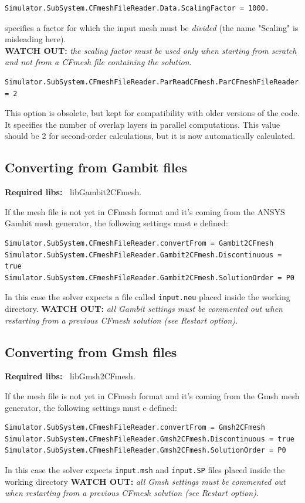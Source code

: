 \documentclass[11pt]{article}
\begin{document}
\begin{verbatim}
Simulator.SubSystem.CFmeshFileReader.Data.ScalingFactor = 1000. 
\end{verbatim}
specifies a factor for which the input mesh must be {\it divided} (the name "Scaling" is misleading here). \\
{\bf WATCH OUT:} {\it the scaling factor must be used only when starting from scratch and not from a CFmesh file
  containing the solution.}
  
\begin{verbatim}
Simulator.SubSystem.CFmeshFileReader.ParReadCFmesh.ParCFmeshFileReader.NbOverlapLayers = 2
\end{verbatim}
This option is obsolete, but kept for compatibility with older versions of the code. It specifies the number 
of overlap layers in parallel computations. This value should be 2 for second-order calculations, 
but it is now automatically calculated.

\subsection{Converting from Gambit files}

{\bf Required libs:~} libGambit2CFmesh.

If the mesh file is not yet in CFmesh format and it's coming from the ANSYS Gambit mesh generator,
the following settings must e defined:  

\begin{verbatim}
Simulator.SubSystem.CFmeshFileReader.convertFrom = Gambit2CFmesh
Simulator.SubSystem.CFmeshFileReader.Gambit2CFmesh.Discontinuous = true
Simulator.SubSystem.CFmeshFileReader.Gambit2CFmesh.SolutionOrder = P0
\end{verbatim}
In this case the solver expects a file called {\tt input.neu} placed inside the working directory.
{\bf WATCH OUT:} {\it all Gambit settings must be commented out when restarting from a previous CFmesh solution 
  (see Restart option).}

\subsection{Converting from Gmsh files}

{\bf Required libs:~} libGmsh2CFmesh.

If the mesh file is not yet in CFmesh format and it's coming from the Gmsh mesh generator,
the following settings must e defined:  

\begin{verbatim}
Simulator.SubSystem.CFmeshFileReader.convertFrom = Gmsh2CFmesh
Simulator.SubSystem.CFmeshFileReader.Gmsh2CFmesh.Discontinuous = true
Simulator.SubSystem.CFmeshFileReader.Gmsh2CFmesh.SolutionOrder = P0
\end{verbatim}
In this case the solver expects {\tt input.msh} and {\tt input.SP} files placed inside the working directory
{\bf WATCH OUT:} {\it all Gmsh settings must be commented out when restarting from a previous CFmesh solution 
  (see Restart option).}
\end{document}
